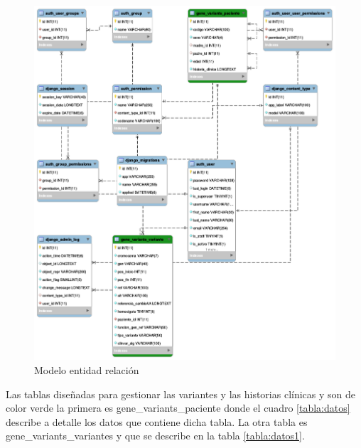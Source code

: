 \begin{figure}[H]
	\centering
	\includegraphics[width=1\textwidth]{Kap3/EER}
	\caption{Modelo entidad relación} \label{fig:t}
\end{figure}

Las tablas diseñadas para gestionar las variantes y las historias clínicas y son de color verde la primera es gene\_variants\_paciente donde el cuadro \ref{tabla:datos} describe a detalle los datos que contiene dicha tabla.  La otra tabla es gene\_variants\_variantes y que se describe en la tabla \ref{tabla:datos1}.

